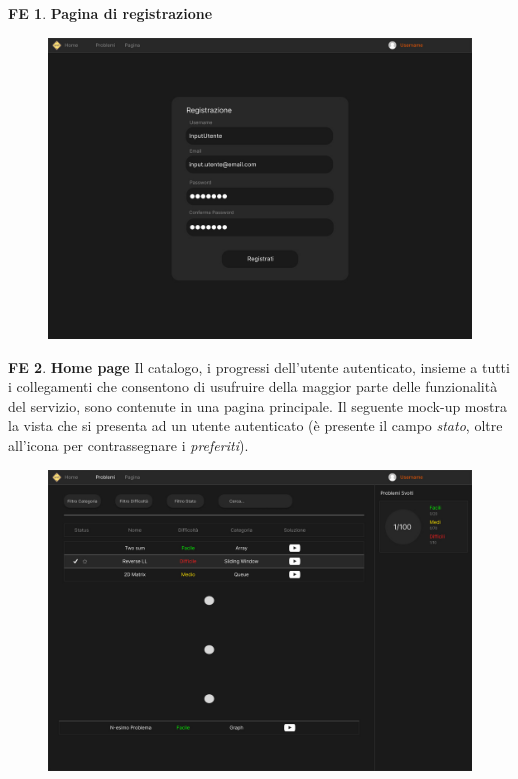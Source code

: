 \documentclass[11pt, a4paper]{article}
\theoremstyle{definition}
\newtheorem{frontend}{FE}
\begin{document}
\begin{frontend}
\label{areaexercise}
\textbf{Pagina di registrazione }
\end{frontend}
\begin{figure}[H]
\centering
\includegraphics[scale=0.22]{materiale/immaginife/registrazione.jpeg}
\end{figure}

\newpage
\begin{frontend}
\textbf{Home page }
Il catalogo, i progressi dell'utente autenticato, insieme a tutti i
collegamenti che consentono di usufruire della maggior parte delle
funzionalità del servizio, sono contenute in una pagina principale.
Il seguente mock-up mostra la vista che si presenta ad un utente
autenticato (è presente il campo \textit{stato}, oltre all'icona per
contrassegnare i \textit{preferiti}).
\end{frontend}
\begin{figure}[H]
\centering
\includegraphics[scale=0.195]{materiale/immaginife/homecatalogo.jpeg}
\end{figure}
\end{document}
